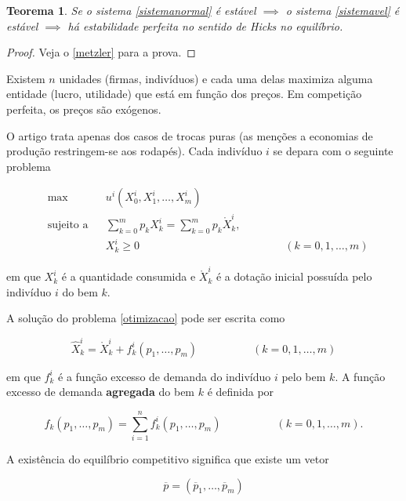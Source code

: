 \documentclass[
	12pt,				%
	openright,			%
	twoside,			%
	a4paper,			%
	english,			%
	french,				%
	spanish,			%
	brazil				%
	]{abntex2}
\newtheorem{teorema}{Teorema}[chapter]
\newcommand{\espaco}{\hspace{5em}}
\newcommand{\pbarra}{\overline{p}}
\newcommand{\Xchapeuik}{\hat{X}^i_k}
\newcommand{\Xbolaik}{\mathring{X}^i_k}
\newcommand{\Xik}{X^i_k}
\newcommand{\somani}{\sum^n_{i=1}}
\begin{document}
\begin{teorema}
	Se o sistema \ref{sistemanormal} é estável $\implies$ o sistema \ref{sistemavel}
	é estável $\implies$ há estabilidade perfeita no sentido de Hicks no equilíbrio.
\end{teorema}

\begin{proof}
Veja o \autoref{metzler} para a prova.
\end{proof}

Existem $n$ unidades (firmas, indivíduos) e cada uma delas maximiza
alguma entidade (lucro, utilidade) que está em função dos preços.
Em competição perfeita, os preços são exógenos.

O artigo trata apenas dos casos de trocas puras (as menções a economias de produção
restringem-se aos rodapés). Cada indivíduo $i$ se depara com o seguinte problema

\begin{equation} \label{otimizacao}
\begin{aligned}
& \text{max}
& & u^i(X^i_0, X^i_1, \ldots, X^i_m) \\
& \text{sujeito a}
& & \sum^m_{k = 0} p_k\Xik = \sum^m_{k = 0} p_k\Xbolaik, \\
&&& \Xik \geq 0
&&&&& (k = 0, 1, \ldots, m)
\end{aligned}
\end{equation}

em que $\Xik$ é a quantidade consumida e
$\Xbolaik$ é a dotação inicial possuída pelo indivíduo $i$ do bem $k$.

A solução do problema \ref{otimizacao} pode ser escrita como

\begin{equation}
	\Xchapeuik =  \Xbolaik + f^i_k(p_1, \ldots, p_m) \espaco (k = 0, 1, \ldots, m)
\end{equation}

em que $f^i_k$ é a função excesso de demanda do indivíduo $i$ pelo bem $k$.
A função excesso de demanda \textbf{agregada} do bem $k$ é definida por

\begin{equation}
	f_k(p_1, \ldots, p_m) = \somani  f^i_k(p_1, \ldots, p_m) \espaco
	(k = 0, 1, \ldots, m).
\end{equation}

A existência do equilíbrio competitivo significa que existe um vetor

\begin{equation}
	\pbarra = (\pbarra_1, \ldots, \pbarra_m)
\end{equation}
\end{document}
